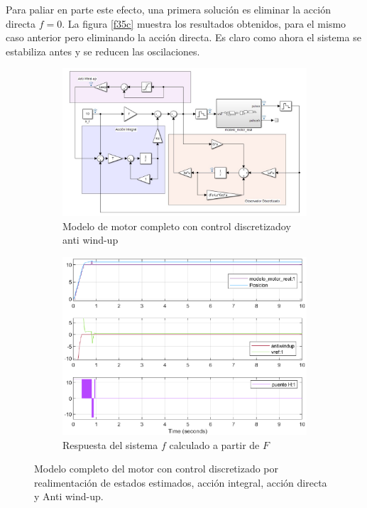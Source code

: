 \documentclass[10pt,a4paper]{report}
\begin{document}
Para paliar en parte este efecto, una primera solución es eliminar la acción directa $f=0$. La figura \ref{f35c} muestra los resultados obtenidos, para el mismo caso anterior pero eliminando la acción directa. Es claro como ahora el sistema se estabiliza antes y se reducen las oscilaciones.

\begin{figure}
\centering
\begin{subfigure}{0.6\textwidth}
\includegraphics[width=\textwidth]{antiwindup.jpg}
\caption{Modelo de motor completo con control discretizadoy anti wind-up}
\label{f36a}
\end{subfigure}
\begin{subfigure}{0.6\textwidth}
\includegraphics[width=\textwidth]{antiwindup.eps}
\caption{Respuesta del sistema $f$ calculado a partir de $F$}
\label{f36b}
\end{subfigure}
\caption{Modelo completo del motor con control discretizado por realimentación de estados estimados, acción integral, acción directa y Anti wind-up.}
\end{figure}
\end{document}
